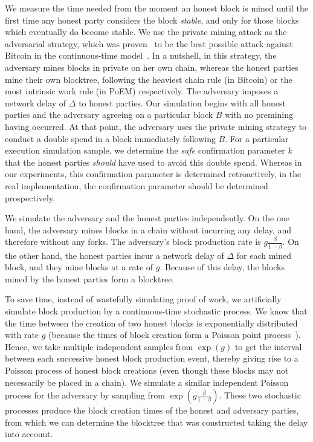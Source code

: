 We measure the time needed from the moment an honest block is mined until
the first time any honest party considers the block \emph{stable}, and only for those blocks
which eventually do become stable.
We use the private mining attack as the adversarial strategy, which was
proven~\cite{eiar} to be the best possible attack against Bitcoin in the continuous-time model~\cite{bitcoin-made-simple}.
In a nutshell, in this strategy, the adversary mines blocks in private on her own chain, whereas the honest parties mine
their own blocktree, following the heaviest chain rule (in Bitcoin) or the most intrinsic work rule (in PoEM) respectively.
The adversary imposes a network delay of $\Delta$ to honest parties.
Our simulation begins with all honest parties and the adversary agreeing on a particular block
$B$ with no premining having occurred. At that point, the adversary uses the private mining strategy
to conduct a double spend in a block immediately following $B$.
For a particular execution simulation sample, we determine the \emph{safe} confirmation parameter $k$
that the honest parties \emph{should} have used to avoid this double spend.
Whereas in our experiments, this confirmation parameter is determined retroactively,
in the real implementation, the confirmation parameter should be determined prospectively.

We simulate the adversary and the honest parties independently. On the one hand, the adversary mines blocks
in a chain without incurring any delay, and therefore without any forks. The adversary's block production rate is
$g\frac{\beta}{1 - \beta}$. On the other hand, the honest parties incur a network delay of $\Delta$ for each mined block,
and they mine blocks at a rate of $g$. Because of this delay, the blocks mined by the honest parties form a blocktree.

To save time, instead of wastefully simulating proof of work, we artificially simulate block production by a
continuous-time stochastic process.
We know that the time between the creation of two honest blocks is exponentially distributed
with rate $g$ (because the times of block creation form a Poisson point process~\cite{bitcoin-made-simple}).
Hence, we take multiple independent samples from $\exp(g)$ to get the interval between each successive honest block production event,
thereby giving rise to a Poisson process of honest block creations (even though these blocks may not necessarily be placed in a chain).
We simulate a similar independent Poisson process for the adversary
by sampling from $\exp(g\frac{\beta}{1 - \beta})$. These two stochastic processes produce the block creation times of the honest and
adversary parties, from which we can determine the blocktree that was constructed taking the delay into account.

